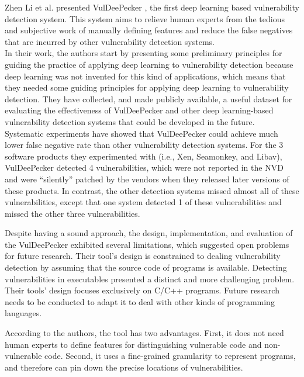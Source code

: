 Zhen Li et al. presented VulDeePecker \cite{Zhen_Li2018}, the first deep learning based vulnerability detection system. This system aims to relieve human experts from the tedious and subjective work of manually defining features and reduce the false negatives that are incurred by other vulnerability detection systems.\\ 

In their work, the authors start by presenting some preliminary principles for guiding the practice of applying deep learning to vulnerability detection because deep learning was not invented for this kind of applications, which means that they needed some guiding principles for applying deep learning to vulnerability detection. They have collected, and made publicly available, a useful dataset for evaluating the effectiveness of VulDeePecker and other deep learning-based vulnerability detection systems that could be developed in the future. \\

Systematic experiments have showed that VulDeePecker could achieve much lower false negative rate than other vulnerability detection systems. For the 3 software products they experimented with (i.e., Xen, Seamonkey, and Libav), VulDeePecker detected 4 vulnerabilities, which were not reported in the NVD and were “silently” patched by the vendors when they released later versions of these products. In contrast, the other detection systems missed almost all of these vulnerabilities, except that one system detected 1 of these vulnerabilities and missed the other three vulnerabilities.

Despite having a sound approach, the design, implementation, and evaluation of the VulDeePecker exhibited several limitations, which suggested open problems for future research. Their tool's design is constrained to dealing vulnerability detection by assuming that the source code of programs is available. Detecting vulnerabilities in executables presented a distinct and more challenging problem. Their tools' design focuses exclusively on C/C++ programs. Future research needs to be conducted to adapt it to deal with other kinds of programming languages. 

According to the authors, the tool has two advantages. First, it does not need human experts to define features for distinguishing vulnerable code and non-vulnerable code. Second, it uses a fine-grained granularity to represent programs, and therefore can pin down the precise locations of vulnerabilities.

